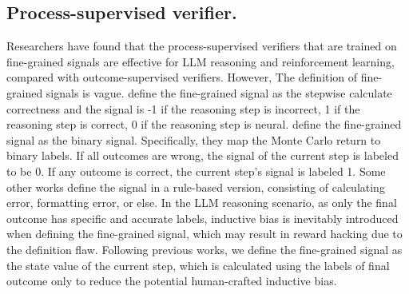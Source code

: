 \subsection{Process-supervised verifier.}
Researchers have found that the process-supervised verifiers that are trained on fine-grained signals are effective for LLM reasoning and reinforcement learning, compared with outcome-supervised verifiers\cite{DBLP:conf/iclr/LightmanKBEBLLS24}. However, The definition of fine-grained signals is vague. \citet{DBLP:conf/iclr/LightmanKBEBLLS24} define the fine-grained signal as the stepwise calculate correctness and the signal is -1 if the reasoning step is incorrect, 1 if the reasoning step is correct, 0 if the reasoning step is neural. \citet{DBLP:conf/acl/WangLSXDLCWS24} define the fine-grained signal as the binary signal. Specifically, they map the Monte Carlo return to binary labels. If all outcomes are wrong, the signal of the current step is labeled to be 0. If any outcome is correct, the current step's signal is labeled 1. Some other works define the signal in a rule-based version, consisting of calculating error, formatting error, or else\citep{DBLP:conf/icml/XiCHJZHDLGWGSFZ24, DBLP:journals/corr/abs-2412-06559}. In the LLM reasoning scenario, as only the final outcome has specific and accurate labels, inductive bias is inevitably introduced when defining the fine-grained signal, which may result in reward hacking due to the definition flaw\citep{deepseekai2025deepseekr1incentivizingreasoningcapability}. Following previous works\citep{DBLP:journals/corr/abs-2406-06592,DBLP:journals/corr/abs-2408-03314,lu2024autopsv}, we define the fine-grained signal as the state value of the current step, which is calculated using the labels of final outcome only to reduce the potential human-crafted inductive bias.

